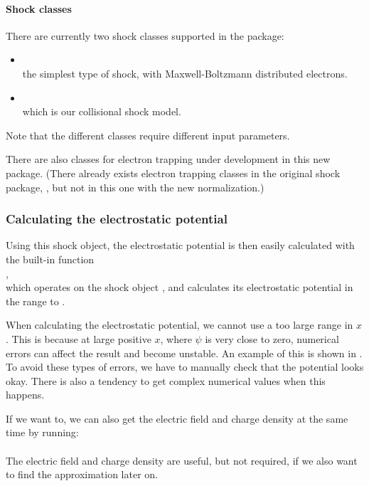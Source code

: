 \documentclass[11pt,a4paper, 
swedish, english %
]{article}
\begin{document}
\paragraph{Shock classes}
There are currently two shock classes supported in the
 package:
\begin{itemize}
\item {}\\
the simplest type of shock, with Maxwell-Boltzmann distributed
electrons. 
\item {}\\
which is our collisional shock model. 
\end{itemize}
Note that the different classes require different input parameters.

There are also classes for electron trapping under development in this
new package. (There already exists electron trapping classes in the
original shock package, , but not in this one with
the new normalization.)


\subsubsection{Calculating the electrostatic potential}
Using this shock object, the electrostatic potential is then easily
calculated with the built-in function\\
\indent{},\\
which operates on the shock object , and calculates its
electrostatic potential in the range  to .

When calculating the electrostatic potential, we cannot use a too
large range in $x$. This is because at large positive $x$, where
$\psi$ is very close to zero, numerical errors can affect the result
and become unstable. An example of this is shown in
. To avoid these types of errors, we have
to manually check that the potential looks okay. There is also a
tendency to get complex numerical values when this happens.

If we want to, we can also get the electric field and charge density
at the same time by running:\\
\indent{}\\
The electric field and charge density are useful, but not required, if
we also want to find the approximation later on.
\end{document}

